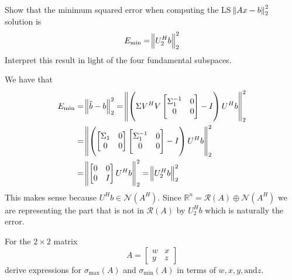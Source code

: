 \documentclass{homework}
\begin{document}
\begin{problem}[7-5]
  Show that the minimum squared error when computing the LS $\norm{Ax - b}_2^2$ solution is 
  \[ E_{\text{min}} = \norm{U_2^Hb}_2^2\]
  Interpret this result in light of the four fundamental subspaces.
\end{problem}

\begin{solution}
  We have that 
  \[
    \begin{aligned}
      E_{\text{min}} &= \norm{\hat{b} - b}_2^2 = \norm{\left(\Sigma V^HV
      \begin{bmatrix}
        \Sigma_1^{-1} & 0 \\
        0 & 0
      \end{bmatrix}
  - I\right)U^Hb}_2^2 \\
      &= \norm{\left(
      \begin{bmatrix}
        \Sigma_1 & 0 \\
        0 & 0
      \end{bmatrix}
      \begin{bmatrix}
        \Sigma_1^{-1} & 0 \\
        0 & 0
      \end{bmatrix}
  - I\right)U^Hb}_2^2 \\
  &=\norm{
  \begin{bmatrix}
    0 & 0 \\
    0 & I
  \end{bmatrix}U^Hb}_2^2 = \norm{U_2^Hb}_2^2
    \end{aligned}\]
    This makes sense because $U^Hb \in \mathcal{N}(A^H)$. Since $\mathds{R}^n = \mathcal{R}(A) \oplus \mathcal{N}(A^H)$ we are representing the part that is not in $\mathcal{R}(A)$ by $U_2^Hb$ which is naturally the error.
\end{solution}

\begin{problem}[7-9]
 For the $2 \times 2$ matrix 
 \[
   A = 
   \begin{bmatrix}
     w & x \\
     y & z
   \end{bmatrix}
 \]
 derive expressions for $\sigma_{\max}(A)$ and $\sigma_{\min}(A)$ in terms of $w,x,y, \text{and} z$.
\end{problem}
\end{document}

